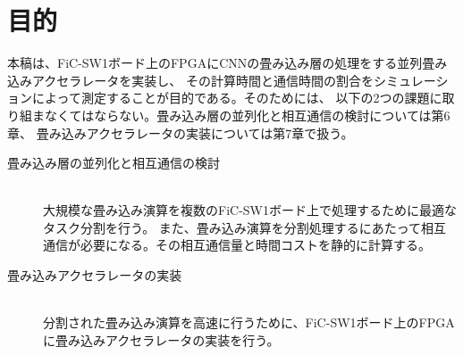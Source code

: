 \chapter{目的}
本稿は、FiC-SW1ボード上のFPGAにCNNの畳み込み層の処理をする並列畳み込みアクセラレータを実装し、
その計算時間と通信時間の割合をシミュレーションによって測定することが目的である。そのためには、
以下の2つの課題に取り組まなくてはならない。畳み込み層の並列化と相互通信の検討については第6章、
畳み込みアクセラレータの実装については第7章で扱う。

\begin{description}
 \item[畳み込み層の並列化と相互通信の検討]\mbox{}\\ 
	    大規模な畳み込み演算を複数のFiC-SW1ボード上で処理するために最適なタスク分割を行う。
	    また、畳み込み演算を分割処理するにあたって相互通信が必要になる。その相互通信量と時間コストを静的に計算する。
 \item[畳み込みアクセラレータの実装]\mbox{}\\
	    分割された畳み込み演算を高速に行うために、FiC-SW1ボード上のFPGAに畳み込みアクセラレータの実装を行う。
\end{description}



